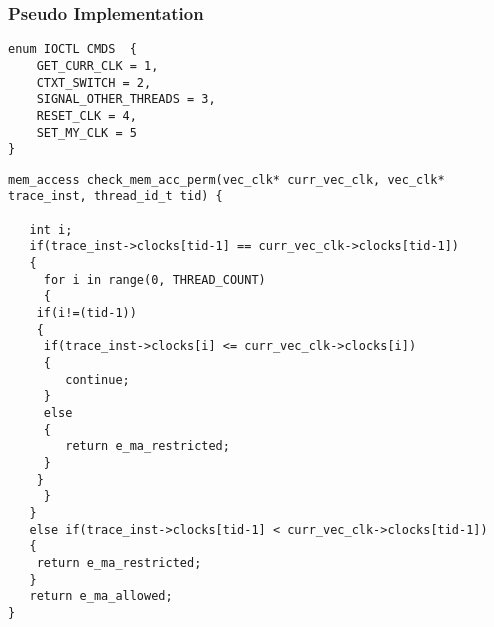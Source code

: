 

\newpage
\subsubsection*{Pseudo Implementation}
\begin{lstlisting}[title=Data Types Section used by user space and kernel space, style=customc]
enum IOCTL CMDS  { 
	GET_CURR_CLK = 1, 
  	CTXT_SWITCH = 2, 
  	SIGNAL_OTHER_THREADS = 3,
  	RESET_CLK = 4,
  	SET_MY_CLK = 5
}
\end{lstlisting}

\begin{lstlisting}[title=Check Permission for memory access, style=customc]
mem_access check_mem_acc_perm(vec_clk* curr_vec_clk, vec_clk* trace_inst, thread_id_t tid) {

   int i;
   if(trace_inst->clocks[tid-1] == curr_vec_clk->clocks[tid-1]) 
   {
     for i in range(0, THREAD_COUNT) 
     {
	if(i!=(tid-1)) 
	{
	 if(trace_inst->clocks[i] <= curr_vec_clk->clocks[i]) 
	 {
	 	continue;
	 }
	 else 
	 {
	 	return e_ma_restricted;
	 }
	}
     }
   }
   else if(trace_inst->clocks[tid-1] < curr_vec_clk->clocks[tid-1]) 
   {
   	return e_ma_restricted;
   }
   return e_ma_allowed;
}

\end{lstlisting}


